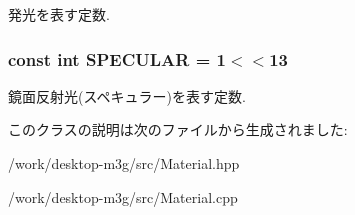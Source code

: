 発光を表す定数. \hypertarget{classm3g_1_1Material_cac20b25665d9a3713bec3a772a89ede}{
\subsubsection[{SPECULAR}]{\setlength{\rightskip}{0pt plus 5cm}const int {\bf SPECULAR} = 1$<$$<$13}}
\label{classm3g_1_1Material_cac20b25665d9a3713bec3a772a89ede}


鏡面反射光(スペキュラー)を表す定数. 

このクラスの説明は次のファイルから生成されました:\begin{CompactItemize}
\item 
/work/desktop-m3g/src/Material.hpp\item 
/work/desktop-m3g/src/Material.cpp\end{CompactItemize}
